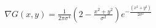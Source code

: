 \documentclass[10pt]{article}
\begin{document}
\begin{align*}\nabla G(x,y)=\frac{1}{2\pi\sigma^4}(2-\frac{x^2+y^2}{\sigma^2})e^{-\frac{(x^2+y^2)}{2\sigma^2}}\end{align*}
\end{document}
